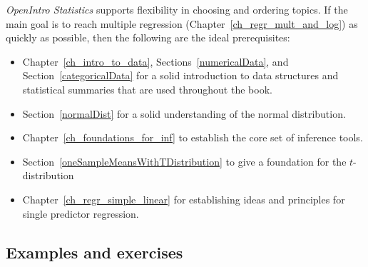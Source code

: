 \noindent%
\emph{OpenIntro Statistics} supports flexibility
in choosing and ordering topics.
If the main goal is to reach multiple regression
(Chapter~\ref{ch_regr_mult_and_log})
as quickly as possible, then the following are the
ideal prerequisites:
\begin{itemize}
\setlength{\itemsep}{0mm}
\item Chapter~\ref{ch_intro_to_data},
    Sections~\ref{numericalData},
    and Section~\ref{categoricalData} for a solid
    introduction to data structures and statistical
    summaries that are used throughout the book.
\item Section~\ref{normalDist}
    for a solid understanding of the normal distribution.
\item Chapter~\ref{ch_foundations_for_inf}
    to establish the core set of inference tools.
%    
%    
\item Section~\ref{oneSampleMeansWithTDistribution}
    to give a foundation for the $t$-distribution
\item Chapter~\ref{ch_regr_simple_linear}
    for establishing ideas and principles for single
    predictor regression.
\end{itemize}


\subsection*{{\color{oiB}Examples and exercises}}

